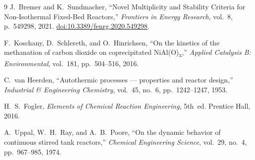 \documentclass[11pt,a4paper]{article}
\begin{document}
\begin{thebibliography}{9}
  J.\ Bremer and K.\ Sundmacher,
  ``Novel Multiplicity and Stability Criteria for Non-Isothermal Fixed-Bed
  Reactors,''
  \textit{Frontiers in Energy Research}, vol.~8, p.~549298, 2021.
  \href{https://doi.org/10.3389/fenrg.2020.549298}{doi:10.3389/fenrg.2020.549298}.

  F.\ Koschany, D.\ Schlereth, and O.\ Hinrichsen,
  ``On the kinetics of the methanation of carbon dioxide on coprecipitated
  NiAl(O)\textsubscript{x},''
  \textit{Applied Catalysis B: Environmental}, vol.~181, pp.~504--516, 2016.

  C.\ van Heerden,
  ``Autothermic processes — properties and reactor design,''
  \textit{Industrial \& Engineering Chemistry}, vol.~45, no.~6,
  pp.~1242--1247, 1953.

  H.\ S.\ Fogler,
  \textit{Elements of Chemical Reaction Engineering}, 5th~ed.
  Prentice Hall, 2016.

  A.\ Uppal, W.\ H.\ Ray, and A.\ B.\ Poore,
  ``On the dynamic behavior of continuous stirred tank reactors,''
  \textit{Chemical Engineering Science}, vol.~29, no.~4,
  pp.~967--985, 1974.
\end{thebibliography}
\end{document}
